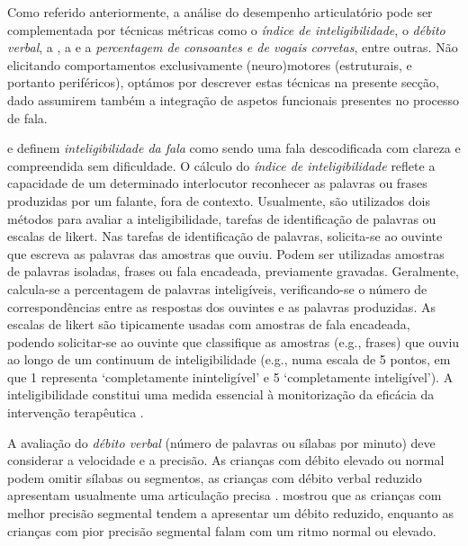 \documentclass[output=paper]{LSP/langsci}
\begin{document}
Como referido anteriormente, a análise do desempenho articulatório pode ser complementada por técnicas métricas como o \textit{índice de inteligibilidade}, o \textit{débito verbal}, a \textit{}, a \textit{} e a \textit{percentagem de consoantes e de vogais corretas}, entre outras. Não elicitando comportamentos exclusivamente (neuro)motores (estruturais, e portanto periféricos), optámos por descrever estas técnicas na presente secção, dado assumirem também a integração de aspetos funcionais presentes no processo de fala. 

\citet{miller2013} e \citet{pascoe_etal2006} definem \textit{inteligibilidade da fala} como sendo uma fala descodificada com clareza e compreendida sem dificuldade. O cálculo do \textit{índice de inteligibilidade} reflete a capacidade de um determinado interlocutor reconhecer as palavras ou frases produzidas por um falante, fora de contexto. Usualmente, são utilizados dois métodos para avaliar a inteligibilidade, tarefas de identificação de palavras ou escalas de likert. Nas tarefas de identificação de palavras, solicita-se ao ouvinte que escreva as palavras das amostras que ouviu. Podem ser utilizadas amostras de palavras isoladas, frases ou fala encadeada, previamente gravadas. Geralmente, calcula-se a percentagem de palavras inteligíveis, verificando-se o número de correspondências entre as respostas dos ouvintes e as palavras produzidas. As escalas de likert são tipicamente usadas com amostras de fala encadeada, podendo solicitar-se ao ouvinte que classifique as amostras (e.g., frases) que ouviu ao longo de um continuum de inteligibilidade (e.g., numa escala de 5 pontos, em que 1 representa ‘completamente ininteligível’ e 5 ‘completamente inteligível’). A inteligibilidade constitui uma medida essencial à monitorização da eficácia da intervenção terapêutica \citep{lousada_etal2014}.

A avaliação do \textit{débito verbal} (número de palavras ou sílabas por minuto) deve considerar a velocidade e a precisão. As crianças com débito elevado ou normal podem omitir sílabas ou segmentos, as crianças com débito verbal reduzido apresentam usualmente uma articulação precisa \citep{bowen2015}. \citet{skinder2000} mostrou que as crianças com melhor precisão segmental tendem a apresentar um débito reduzido, enquanto as crianças com pior precisão segmental falam com um ritmo normal ou elevado. 
\end{document}
